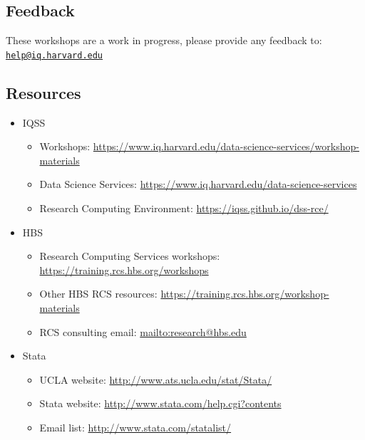 \documentclass[
]{book}
\providecommand{\tightlist}{%
  \setlength{\itemsep}{0pt}\setlength{\parskip}{0pt}}
\begin{document}
\hypertarget{feedback-7}{%
\subsection{Feedback}\label{feedback-7}}

These workshops are a work in progress, please provide any feedback to: \href{mailto:help@iq.harvard.edu}{\nolinkurl{help@iq.harvard.edu}}

\hypertarget{resources-10}{%
\subsection{Resources}\label{resources-10}}

\begin{itemize}
\tightlist
\item
  IQSS

  \begin{itemize}
  \tightlist
  \item
    Workshops: \url{https://www.iq.harvard.edu/data-science-services/workshop-materials}
  \item
    Data Science Services: \url{https://www.iq.harvard.edu/data-science-services}
  \item
    Research Computing Environment: \url{https://iqss.github.io/dss-rce/}
  \end{itemize}
\item
  HBS

  \begin{itemize}
  \tightlist
  \item
    Research Computing Services workshops: \url{https://training.rcs.hbs.org/workshops}
  \item
    Other HBS RCS resources: \url{https://training.rcs.hbs.org/workshop-materials}
  \item
    RCS consulting email: \url{mailto:research@hbs.edu}
  \end{itemize}
\item
  Stata

  \begin{itemize}
  \tightlist
  \item
    UCLA website: \url{http://www.ats.ucla.edu/stat/Stata/}
  \item
    Stata website: \url{http://www.stata.com/help.cgi?contents}
  \item
    Email list: \url{http://www.stata.com/statalist/}
  \end{itemize}
\end{itemize}
\end{document}
